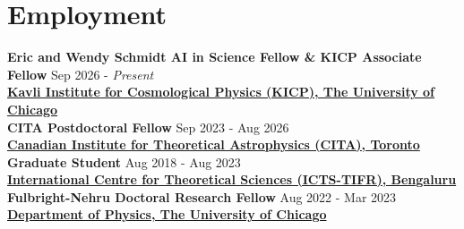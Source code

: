 		
		
		\section{Employment}
        \textbf{Eric and Wendy Schmidt AI in Science Fellow \& KICP Associate Fellow} \hfill Sep 2026 - \textit{Present}
		\\
            \vspace{0.4em}\textbf{\href{https://kicp.uchicago.edu/}{Kavli Institute for Cosmological Physics (KICP), The University of Chicago}}\\
            \textbf{CITA Postdoctoral Fellow} \hfill Sep 2023 - Aug 2026
		\\
            \vspace{0.4em}\textbf{\href{https://www.cita.utoronto.ca/}{Canadian Institute for Theoretical Astrophysics (CITA), Toronto}}\\
            \textbf{Graduate Student} \hfill Aug 2018 - Aug 2023
		\\
		\vspace{0.4em}\textbf{\href{https://www.icts.res.in/}{International Centre for Theoretical Sciences (ICTS-TIFR), Bengaluru}}\\
		\textbf{Fulbright-Nehru Doctoral Research Fellow } \hfill Aug 2022 - Mar 2023
		\\
		\textbf{\href{https://physics.uchicago.edu/}{Department of Physics, The University of Chicago}}
		
